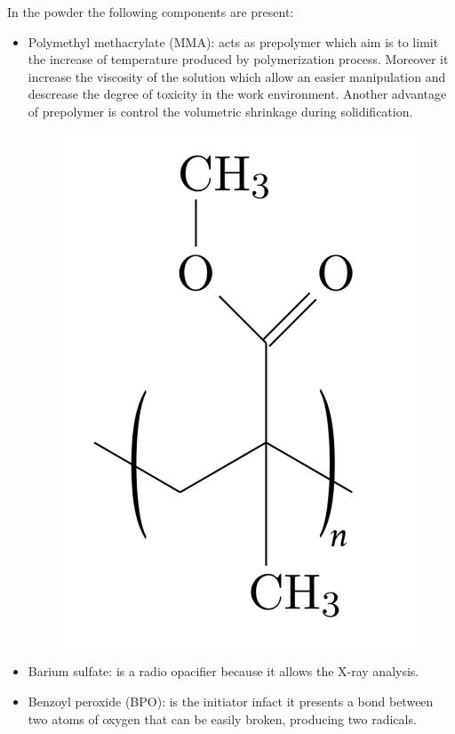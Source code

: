 \documentclass[a4paper, 11pt]{article}
\begin{document}
In the powder the following components are present:
\begin{itemize}
\item Polymethyl methacrylate (MMA): acts as prepolymer which aim is to limit the increase of temperature produced by polymerization process. Moreover it increase the viscosity of the solution which allow an easier manipulation and descrease the degree of toxicity in the work environment. Another advantage of prepolymer is control the volumetric shrinkage during solidification.
\begin{figure}[h]
	\centering
	{\includegraphics[scale=0.15]{pmma_chem}}
	\captionsetup{justification=centering}
	\label{fig:PE}
\end{figure}
\item Barium sulfate: is a radio opacifier because it allows the X-ray analysis.
\item Benzoyl peroxide (BPO): is the initiator infact it presents a bond between two atoms of oxygen that can be easily broken, producing two radicals.
\begin{figure}[h]
\centering
{} 
\end{figure}
\end{itemize}
\end{document}
